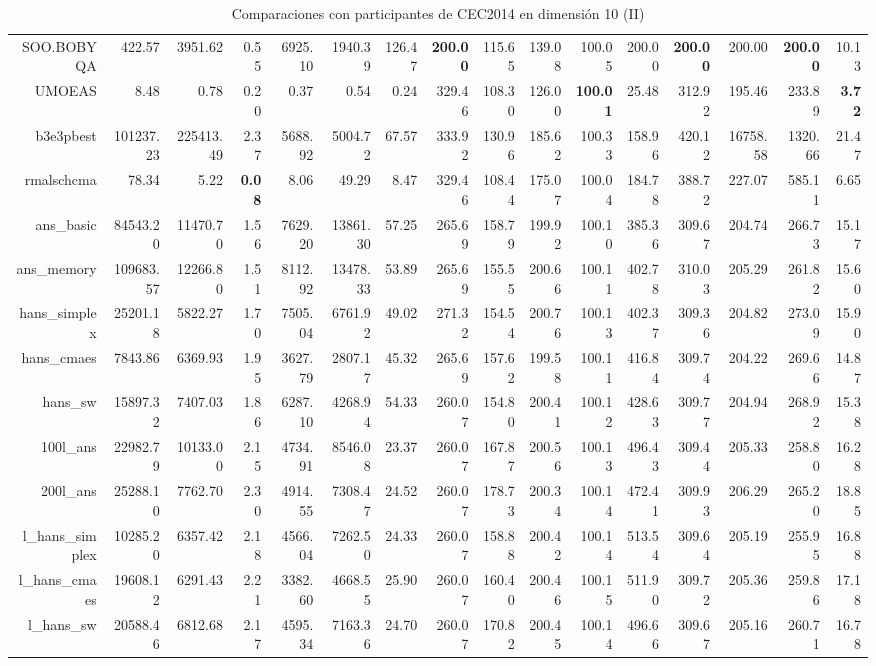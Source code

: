 \begin{table}[h!]
\begin{tabular}{rrrrrrrrrrrrrrrr}
  SOO.BOBYQA & 422.57 & 3951.62 & 0.55 & 6925.10 & 1940.39 & 126.47 & \textbf{200.00} & 115.65 & 139.08 & 100.05 & 200.00 & \textbf{200.00} & 200.00 & \textbf{200.00} & 10.13 \\ 
  UMOEAS & 8.48 & 0.78 & 0.20 & 0.37 & 0.54 & 0.24 & 329.46 & 108.30 & 126.00 & \textbf{100.01} & 25.48 & 312.92 & 195.46 & 233.89 & \textbf{3.72} \\ 
  b3e3pbest & 101237.23 & 225413.49 & 2.37 & 5688.92 & 5004.72 & 67.57 & 333.92 & 130.96 & 185.62 & 100.33 & 158.96 & 420.12 & 16758.58 & 1320.66 & 21.47 \\ 
  rmalschcma & 78.34 & 5.22 & \textbf{0.08} & 8.06 & 49.29 & 8.47 & 329.46 & 108.44 & 175.07 & 100.04 & 184.78 & 388.72 & 227.07 & 585.11 & 6.65 \\ 
  ans\_basic & 84543.20 & 11470.70 & 1.56 & 7629.20 & 13861.30 & 57.25 & 265.69 & 158.79 & 199.92 & 100.10 & 385.36 & 309.67 & 204.74 & 266.73 & 15.17 \\ 
  ans\_memory & 109683.57 & 12266.80 & 1.51 & 8112.92 & 13478.33 & 53.89 & 265.69 & 155.55 & 200.66 & 100.11 & 402.78 & 310.03 & 205.29 & 261.82 & 15.60 \\ 
  hans\_simplex & 25201.18 & 5822.27 & 1.70 & 7505.04 & 6761.92 & 49.02 & 271.32 & 154.54 & 200.76 & 100.13 & 402.37 & 309.36 & 204.82 & 273.09 & 15.90 \\ 
  hans\_cmaes & 7843.86 & 6369.93 & 1.95 & 3627.79 & 2807.17 & 45.32 & 265.69 & 157.62 & 199.58 & 100.11 & 416.84 & 309.74 & 204.22 & 269.66 & 14.87 \\ 
  hans\_sw & 15897.32 & 7407.03 & 1.86 & 6287.10 & 4268.94 & 54.33 & 260.07 & 154.80 & 200.41 & 100.12 & 428.63 & 309.77 & 204.94 & 268.92 & 15.38 \\ 
  100l\_ans & 22982.79 & 10133.00 & 2.15 & 4734.91 & 8546.08 & 23.37 & 260.07 & 167.87 & 200.56 & 100.13 & 496.43 & 309.44 & 205.33 & 258.80 & 16.28 \\ 
  200l\_ans & 25288.10 & 7762.70 & 2.30 & 4914.55 & 7308.47 & 24.52 & 260.07 & 178.73 & 200.34 & 100.14 & 472.41 & 309.93 & 206.29 & 265.20 & 18.85 \\ 
  l\_hans\_simplex & 10285.20 & 6357.42 & 2.18 & 4566.04 & 7262.50 & 24.33 & 260.07 & 158.88 & 200.42 & 100.14 & 513.54 & 309.64 & 205.19 & 255.95 & 16.88 \\ 
  l\_hans\_cmaes & 19608.12 & 6291.43 & 2.21 & 3382.60 & 4668.55 & 25.90 & 260.07 & 160.40 & 200.46 & 100.15 & 511.90 & 309.72 & 205.36 & 259.86 & 17.18 \\ 
  l\_hans\_sw & 20588.46 & 6812.68 & 2.17 & 4595.34 & 7163.36 & 24.70 & 260.07 & 170.82 & 200.45 & 100.14 & 496.66 & 309.67 & 205.16 & 260.71 & 16.78 \\ 
   \hline
\end{tabular}
\endgroup
\caption{Comparaciones con participantes de CEC2014 en dimensión 10 (II)} 
\label{cec10b}
\end{table}
